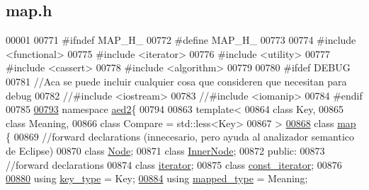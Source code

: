 \hypertarget{map_8h_source}{}\subsection{map.\+h}

\begin{DoxyCode}
00001 
00771 \textcolor{preprocessor}{#ifndef MAP\_H\_}
00772 \textcolor{preprocessor}{#define MAP\_H\_}
00773 
00774 \textcolor{preprocessor}{#include <functional>}
00775 \textcolor{preprocessor}{#include <iterator>}
00776 \textcolor{preprocessor}{#include <utility>}
00777 \textcolor{preprocessor}{#include <cassert>}
00778 \textcolor{preprocessor}{#include <algorithm>}
00779 
00780 \textcolor{preprocessor}{#ifdef DEBUG}
00781 \textcolor{comment}{//Aca se puede incluir cualquier cosa que consideren que necesitan para debug}
00782 \textcolor{comment}{//#include <iostream>}
00783 \textcolor{comment}{//#include <iomanip>}
00784 \textcolor{preprocessor}{#endif}
00785 
\hypertarget{map_8h_source.tex_l00793}{}\hyperlink{namespaceaed2}{00793} \textcolor{keyword}{namespace }\hyperlink{namespaceaed2}{aed2}\{
00794 
00863 \textcolor{keyword}{template}<
00864   \textcolor{keyword}{class }Key,
00865   \textcolor{keyword}{class }Meaning,
00866   \textcolor{keyword}{class }Compare = std::less<Key>
00867 >
\hypertarget{map_8h_source.tex_l00868}{}\hyperlink{classaed2_1_1map}{00868} \textcolor{keyword}{class }\hyperlink{classaed2_1_1map}{map} \{
00869     \textcolor{comment}{//forward declarations (innecesario, pero ayuda al analizador semantico de Eclipse)}
00870     \textcolor{keyword}{class }\hyperlink{structaed2_1_1map_1_1Node}{Node};
00871     \textcolor{keyword}{class }\hyperlink{structaed2_1_1map_1_1InnerNode}{InnerNode};
00872 \textcolor{keyword}{public}:
00873     \textcolor{comment}{//forward declarations}
00874     \textcolor{keyword}{class }\hyperlink{classaed2_1_1map_1_1iterator}{iterator};
00875     \textcolor{keyword}{class }\hyperlink{classaed2_1_1map_1_1const__iterator}{const\_iterator};
00876 
\hypertarget{map_8h_source.tex_l00880}{}\hyperlink{classaed2_1_1map_a4273e8812e7105a618df58a2c8b72b7d_a4273e8812e7105a618df58a2c8b72b7d}{00880}     \textcolor{keyword}{using} \hyperlink{classaed2_1_1map_a4273e8812e7105a618df58a2c8b72b7d_a4273e8812e7105a618df58a2c8b72b7d}{key\_type} = Key;
\hypertarget{map_8h_source.tex_l00884}{}\hyperlink{classaed2_1_1map_aa3e34bf624f3009884a71b18f4ddae40_aa3e34bf624f3009884a71b18f4ddae40}{00884}     \textcolor{keyword}{using} \hyperlink{classaed2_1_1map_aa3e34bf624f3009884a71b18f4ddae40_aa3e34bf624f3009884a71b18f4ddae40}{mapped\_type} = Meaning;

\end{DoxyCode}
